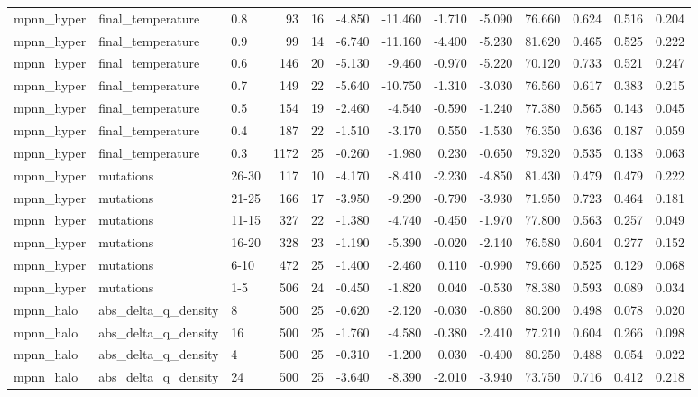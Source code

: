 \begin{table}
\begin{tabular}{lllrrrrrrrrrr}
mpnn\_hyper & final\_temperature & 0.8 & 93 & 16 & -4.850 & -11.460 & -1.710 & -5.090 & 76.660 & 0.624 & 0.516 & 0.204 \\
mpnn\_hyper & final\_temperature & 0.9 & 99 & 14 & -6.740 & -11.160 & -4.400 & -5.230 & 81.620 & 0.465 & 0.525 & 0.222 \\
mpnn\_hyper & final\_temperature & 0.6 & 146 & 20 & -5.130 & -9.460 & -0.970 & -5.220 & 70.120 & 0.733 & 0.521 & 0.247 \\
mpnn\_hyper & final\_temperature & 0.7 & 149 & 22 & -5.640 & -10.750 & -1.310 & -3.030 & 76.560 & 0.617 & 0.383 & 0.215 \\
mpnn\_hyper & final\_temperature & 0.5 & 154 & 19 & -2.460 & -4.540 & -0.590 & -1.240 & 77.380 & 0.565 & 0.143 & 0.045 \\
mpnn\_hyper & final\_temperature & 0.4 & 187 & 22 & -1.510 & -3.170 & 0.550 & -1.530 & 76.350 & 0.636 & 0.187 & 0.059 \\
mpnn\_hyper & final\_temperature & 0.3 & 1172 & 25 & -0.260 & -1.980 & 0.230 & -0.650 & 79.320 & 0.535 & 0.138 & 0.063 \\
mpnn\_hyper & mutations & 26-30 & 117 & 10 & -4.170 & -8.410 & -2.230 & -4.850 & 81.430 & 0.479 & 0.479 & 0.222 \\
mpnn\_hyper & mutations & 21-25 & 166 & 17 & -3.950 & -9.290 & -0.790 & -3.930 & 71.950 & 0.723 & 0.464 & 0.181 \\
mpnn\_hyper & mutations & 11-15 & 327 & 22 & -1.380 & -4.740 & -0.450 & -1.970 & 77.800 & 0.563 & 0.257 & 0.049 \\
mpnn\_hyper & mutations & 16-20 & 328 & 23 & -1.190 & -5.390 & -0.020 & -2.140 & 76.580 & 0.604 & 0.277 & 0.152 \\
mpnn\_hyper & mutations & 6-10 & 472 & 25 & -1.400 & -2.460 & 0.110 & -0.990 & 79.660 & 0.525 & 0.129 & 0.068 \\
mpnn\_hyper & mutations & 1-5 & 506 & 24 & -0.450 & -1.820 & 0.040 & -0.530 & 78.380 & 0.593 & 0.089 & 0.034 \\
mpnn\_halo & abs\_delta\_q\_density & 8 & 500 & 25 & -0.620 & -2.120 & -0.030 & -0.860 & 80.200 & 0.498 & 0.078 & 0.020 \\
mpnn\_halo & abs\_delta\_q\_density & 16 & 500 & 25 & -1.760 & -4.580 & -0.380 & -2.410 & 77.210 & 0.604 & 0.266 & 0.098 \\
mpnn\_halo & abs\_delta\_q\_density & 4 & 500 & 25 & -0.310 & -1.200 & 0.030 & -0.400 & 80.250 & 0.488 & 0.054 & 0.022 \\
mpnn\_halo & abs\_delta\_q\_density & 24 & 500 & 25 & -3.640 & -8.390 & -2.010 & -3.940 & 73.750 & 0.716 & 0.412 & 0.218 \\

\end{tabular}
\end{table}
